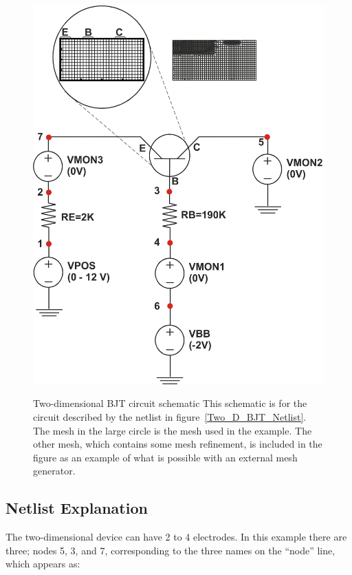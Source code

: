 \begin{figure}
  \centering
  \scalebox{0.5}
  {\includegraphics[]{twoDcircuit}}
  \caption[Two-dimensional BJT circuit schematic]
  {Two-dimensional BJT circuit schematic This schematic is for the circuit described by the netlist in figure~\ref{Two_D_BJT_Netlist}.  The mesh in the large circle is the mesh used in the example.  The other mesh, which contains some mesh refinement, is included in the figure as an example of what is possible with an external mesh generator.
\label{twoD_BJT_Schem}}
\end{figure}

\subsection{Netlist Explanation}
The two-dimensional device can have 2 to 4 electrodes.  In this example there
are three; nodes 5, 3, and 7, corresponding to the three names
on the ``node'' line,  which appears as:

